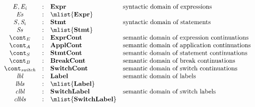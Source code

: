 \documentclass[a4paper,oneside,fleqn]{article}
\newcommand{\synt}[1]{\ensuremath{\text{\textbf{\texttt{#1}}}}}
\newcommand{\dexpr}{\mathbf{Expr}}
\newcommand{\dstmt}{\mathbf{Stmt}}
\newcommand{\decont}{\mathbf{ExprCont}}
\newcommand{\dscont}{\mathbf{StmtCont}}
\newcommand{\dacont}{\mathbf{ApplCont}}
\newcommand{\dbcont}{\mathbf{BreakCont}}
\newcommand{\dswitchcont}{\mathbf{SwitchCont}}
\newcommand{\dlbl}{\mathbf{Label}}
\newcommand{\dclbl}{\mathbf{SwitchLabel}}
\begin{document}
\newcommand{\Initializer}[1]{\synt{Initializer}(#1)}
\newcommand{\FieldInitializer}[1]{\synt{FieldInitializer}(\field, #1)}
\newcommand{\LocalInitializer}[1]{\synt{LocalInitializer}(\varmeta, #1)}
\newcommand{\SuperInitializer}[2]{\synt{SuperInitializer}(#1,\,#2)}
\newcommand{\RedirectingInitializer}[2]{\synt{RedirectingInitializer}(#1,\,#2)}

\[
  \begin{array}{ccll}
    \expr, \expri{i}
    & : & \dexpr & \text{syntactic domain of expressions}\\
    \exprs
    & : & \mlist{\dexpr}\\

    \stmt, \stmti{i}
    & : & \dstmt & \text{syntactic domain of statements}\\
    \stmts
    & : & \mlist{\dstmt}  & \text{}\\

    \econt
    & : & \decont & \text{semantic domain of expression continuations}\\
    \acont
    & : & \dacont & \text{semantic domain of application continuations}\\
    \scont
    & : & \dscont & \text{semantic domain of statement continuations}\\
    \bcont
    & : & \dbcont & \text{semantic domain of break continuations}\\
    \switchcont
    & : & \dswitchcont & \text{semantic domain of switch continuations}\\

    \lbl & : & \dlbl & \text{semantic domain of labels}\\
    \lbls & : & \mlist{\dlbl} \\
    \clbl & : & \dclbl & \text{semantic domain of switch labels}\\
    \clbls & : & \mlist{\dclbl} \\


\end{array}\]
\end{document}
